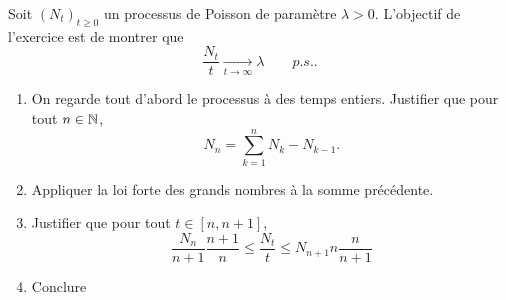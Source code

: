 \documentclass[solutions]{exercices}
\begin{document}
\begin{exercice}
Soit $(N_t)_{t\ge0}$ un processus de Poisson de paramètre $\lambda>0$. L'objectif de l'exercice est de montrer que $$\frac{N_t}{t} \underset{t\to\infty}{\longrightarrow} \lambda\qquad p.s. .$$

\begin{enumerate}
\item On regarde tout d'abord le processus à des temps entiers.
Justifier que pour tout $n\in \mathbb{N}$,
$$N_n=\sum_{k=1}^n N_k-N_{k-1}.$$
\item Appliquer la loi forte des grands nombres à la somme précédente.
\item Justifier que pour tout $t\in[n,n+1]$,
$$\frac{N_n}{n+1}\frac{n+1}{n}\le \frac{N_t}{t} \le N_{n+1}{n}\frac{n}{n+1}$$
\item Conclure
\end{enumerate}
\end{exercice}
\end{document}
